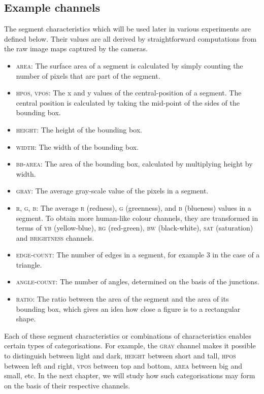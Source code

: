 \subsection{Example channels}
\enlargethispage{1\baselineskip}
The segment characteristics which will be 
used later in various experiments are defined below. 
Their values are all derived by straightforward computations from 
the raw image maps captured by the cameras. 
\begin{itemize} 
\item \textsc{area}: The surface area of a segment
is calculated by simply counting the number of pixels that are part 
of the segment. 
\item \textsc{hpos}, \textsc{vpos}: The x and y values of the 
central-position of a segment. The central position 
is calculated by taking the mid-point of the sides 
of the bounding box. 
\item \textsc{height}: The height of the bounding box. 
\item \textsc{width}: The width of the bounding box. 
\item \textsc{bb-area}: The area of the bounding box,
calculated by multiplying height by width. 
\item \textsc{gray}: The average gray-scale value of the pixels
in a segment. 
\item \textsc{r}, \textsc{g}, \textsc{b}: The average \textsc{r} (redness), \textsc{g}
(greenness), and \textsc{b} (blueness) values in a
segment. To obtain more human-like colour channels, they are
transformed in terms of \textsc{yb} (yellow-blue), \textsc{rg} (red-green), 
\textsc{bw} (black-white), \textsc{sat} (saturation) and \textsc{brightness} channels. 
\item \textsc{edge-count}: The number of edges in
a segment, for example 3 in the case of 
a triangle. 
\item \textsc{angle-count}: The number of angles, determined on the 
basis of the junctions. 
\item \textsc{ratio}: The ratio between the area of the segment 
and the area of its bounding box, which gives an idea how close 
a figure is to a rectangular shape. 
\end{itemize}

Each of these segment characteristics or combinations of
characteristics enables certain types of
categorisations. For example, the \textsc{gray} channel makes 
it possible to distinguish between 
light and dark, \textsc{height} between short and tall, \textsc{hpos} between 
left and right, \textsc{vpos} between top and bottom, 
\textsc{area} between big and small, etc. In the next chapter, we will study 
how such categorisations may 
form on the basis of their respective channels. 


